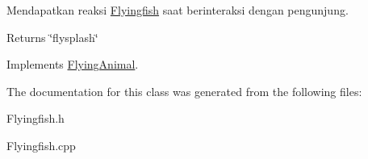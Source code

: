 Mendapatkan reaksi \hyperlink{classFlyingfish}{Flyingfish} saat berinteraksi dengan pengunjung. 

\begin{DoxyReturn}{Returns}
\char`\"{}flysplash\char`\"{} 
\end{DoxyReturn}


Implements \hyperlink{classFlyingAnimal_ac0eee625fa2235eee8cbdc0a010ae430}{Flying\-Animal}.



The documentation for this class was generated from the following files\-:\begin{DoxyCompactItemize}
\item 
Flyingfish.\-h\item 
Flyingfish.\-cpp\end{DoxyCompactItemize}
